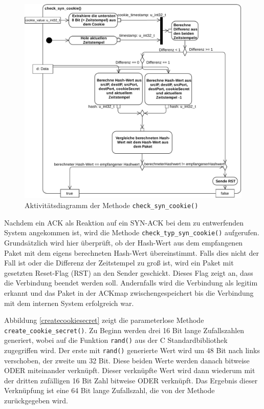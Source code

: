\documentclass[../review_3.tex]{subfiles}
\begin{document}
\begin{figure}[t]
    \centering
    \includegraphics[width=\linewidth]{img/check_typ_syn_cookie_neu.pdf}
    \caption{Aktivitätsdiagramm der Methode \texttt{check\_syn\_cookie()}}
    \label{check_syn_cookie}
\end{figure}
Nachdem ein ACK als Reaktion auf ein SYN-ACK bei dem zu entwerfenden System angekommen ist, wird die Methode \texttt{check\_typ\_syn\_cookie()} aufgerufen.
Grundsätzlich wird hier überprüft, ob der Hash-Wert aus dem empfangenen Paket mit dem eigens berechneten Hash-Wert übereinstimmt. Falls dies nicht der Fall ist oder die Differenz der Zeitstempel zu groß ist, wird ein Paket mit gesetzten Reset-Flag (RST) an den Sender geschickt. Dieses Flag zeigt an, dass die Verbindung beendet werden soll. Andernfalls wird die Verbindung als legitim erkannt und das Paket in der ACKmap zwischengespeichert bis die Verbindung mit dem internen System erfolgreich war.

Abbildung \ref{createcookiesecret} zeigt die parameterlose Methode \texttt{create\_cookie\_secret()}. Zu Beginn werden drei 16 Bit lange Zufallszahlen generiert, wobei auf die Funktion \texttt{rand()} aus der C Standardbibliothek zugegriffen wird. Der erste mit \texttt{rand()} generierte Wert wird um 48 Bit nach links verschoben, der zweite um 32 Bit. Diese beiden Werte werden danach bitweise ODER miteinander verknüpft. Dieser verknüpfte Wert wird dann wiederum mit der dritten zufälligen 16 Bit Zahl bitweise ODER verknüpft. Das Ergebnis dieser Verknüpfung ist eine 64 Bit lange Zufallszahl, die von der Methode zurückgegeben wird.
\end{document}
